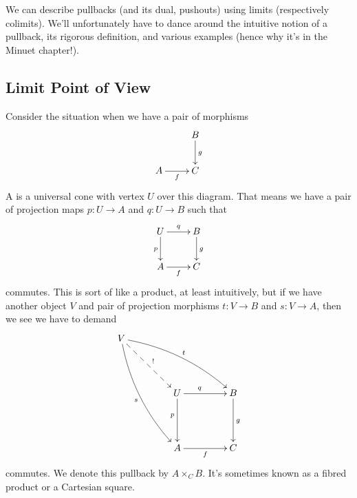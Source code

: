 
We can describe pullbacks (and its dual, pushouts) using limits
(respectively colimits). We'll unfortunately have to dance around
the intuitive notion of a pullback, its rigorous definition, and
various examples (hence why it's in the Minuet chapter!). 

\subsection{Limit Point of View}

Consider the situation when we have a pair of morphisms
\begin{equation}%
\vcenter{\xymatrix{
            & B\ar[d]^{g}\\
A\ar[r]_{f} & C
}}
\end{equation}
A  is a universal cone with vertex $U$ over this
diagram. That means we have a pair of projection maps $p:U\to{A}$
and $q:U\to{B}$ such that
\begin{equation}%
\vcenter{\xymatrix{
U\ar[d]_{p}\ar[r]^{q}   & B \ar[d]^{g}\\
A \ar[r]_{f}           & C
}}
\end{equation}
commutes. This is sort of like a product, at least intuitively,
but if we have another object $V$ and pair of projection
morphisms $t:V\to{B}$ and $s:V\to{A}$, then we see we have to demand
\begin{equation}%
\vcenter{\xymatrix@C+2em@R+2em{
   V \ar@/_10pt/[ddr]_{s} \ar@/^10pt/[drr]^{t} \ar@{-->}[dr]^{\scriptstyle !} & & \\
   & U \ar[d]_(0.4){p} \ar[r]^(0.4){q} & B \ar[d]^{g}\\
   & A \ar[r]_{f} & C
}}
\end{equation}
commutes. We denote this pullback by $A\times_{C}B$. It's
sometimes known as a fibred product or a Cartesian square.
